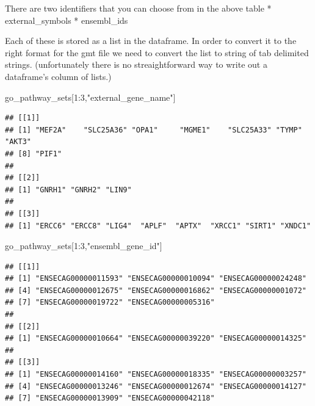 \documentclass[
]{book}
\newenvironment{Shaded}{\begin{snugshade}}{\end{snugshade}}
\newcommand{\AttributeTok}[1]{\textcolor[rgb]{0.77,0.63,0.00}{#1}}
\newcommand{\CommentTok}[1]{\textcolor[rgb]{0.56,0.35,0.01}{\textit{#1}}}
\newcommand{\ControlFlowTok}[1]{\textcolor[rgb]{0.13,0.29,0.53}{\textbf{#1}}}
\newcommand{\DecValTok}[1]{\textcolor[rgb]{0.00,0.00,0.81}{#1}}
\newcommand{\FunctionTok}[1]{\textcolor[rgb]{0.00,0.00,0.00}{#1}}
\newcommand{\NormalTok}[1]{#1}
\newcommand{\OtherTok}[1]{\textcolor[rgb]{0.56,0.35,0.01}{#1}}
\newcommand{\SpecialCharTok}[1]{\textcolor[rgb]{0.00,0.00,0.00}{#1}}
\newcommand{\StringTok}[1]{\textcolor[rgb]{0.31,0.60,0.02}{#1}}
\begin{document}
\begin{Shaded}
\end{Shaded}

There are two identifiers that you can choose from in the above table
* external\_symbols
* ensembl\_ids

Each of these is stored as a list in the dataframe. In order to convert it to the right format for the gmt file we need to convert the list to string of tab delimited strings. (unfortunately there is no streaightforward way to write out a dataframe's column of lists.)

\begin{Shaded}
\begin{Highlighting}[]
\NormalTok{go\_pathway\_sets[}\DecValTok{1}\SpecialCharTok{:}\DecValTok{3}\NormalTok{,}\StringTok{"external\_gene\_name"}\NormalTok{]}
\end{Highlighting}
\end{Shaded}

\begin{verbatim}
## [[1]]
## [1] "MEF2A"    "SLC25A36" "OPA1"     "MGME1"    "SLC25A33" "TYMP"     "AKT3"    
## [8] "PIF1"    
## 
## [[2]]
## [1] "GNRH1" "GNRH2" "LIN9" 
## 
## [[3]]
## [1] "ERCC6" "ERCC8" "LIG4"  "APLF"  "APTX"  "XRCC1" "SIRT1" "XNDC1"
\end{verbatim}

\begin{Shaded}
\begin{Highlighting}[]
\NormalTok{go\_pathway\_sets[}\DecValTok{1}\SpecialCharTok{:}\DecValTok{3}\NormalTok{,}\StringTok{"ensembl\_gene\_id"}\NormalTok{]}
\end{Highlighting}
\end{Shaded}

\begin{verbatim}
## [[1]]
## [1] "ENSECAG00000011593" "ENSECAG00000010094" "ENSECAG00000024248"
## [4] "ENSECAG00000012675" "ENSECAG00000016862" "ENSECAG00000001072"
## [7] "ENSECAG00000019722" "ENSECAG00000005316"
## 
## [[2]]
## [1] "ENSECAG00000010664" "ENSECAG00000039220" "ENSECAG00000014325"
## 
## [[3]]
## [1] "ENSECAG00000014160" "ENSECAG00000018335" "ENSECAG00000003257"
## [4] "ENSECAG00000013246" "ENSECAG00000012674" "ENSECAG00000014127"
## [7] "ENSECAG00000013909" "ENSECAG00000042118"
\end{verbatim}
\end{document}
